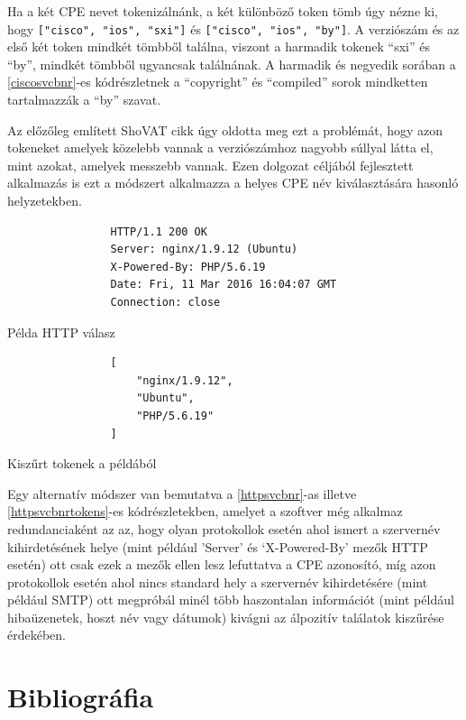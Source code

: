 \documentclass[a4paper,12pt]{article}
\begin{document}
	Ha a két CPE nevet tokenizálnánk, a két különböző token tömb úgy nézne ki, hogy \texttt{["cisco", "ios", "sxi"]} és \texttt{["cisco", "ios", "by"]}. A verziószám és az első két token mindkét tömbből találna, viszont a harmadik tokenek ``sxi'' és ``by'', mindkét tömbből ugyancsak találnának. A harmadik és negyedik sorában a \ref{ciscosvcbnr}-es kódrészletnek a ``copyright'' és ``compiled'' sorok mindketten tartalmazzák a ``by'' szavat.

	Az előzőleg említett ShoVAT\cite{shovat15} cikk úgy oldotta meg ezt a problémát, hogy azon tokeneket amelyek közelebb vannak a verziószámhoz nagyobb súllyal látta el, mint azokat, amelyek messzebb vannak. Ezen dolgozat céljából fejlesztett alkalmazás is ezt a módszert alkalmazza a helyes CPE név kiválasztására hasonló helyzetekben.
	
	\begin{multicols}{2}
		\begin{listing}[H]
			\begin{verbatim}
				HTTP/1.1 200 OK
				Server: nginx/1.9.12 (Ubuntu)
				X-Powered-By: PHP/5.6.19
				Date: Fri, 11 Mar 2016 16:04:07 GMT
				Connection: close
			\end{verbatim}
			\caption{Példa HTTP válasz}
			\label{httpsvcbnr}
		\end{listing}
		\begin{listing}[H]
			\begin{verbatim}
				[
					"nginx/1.9.12",
					"Ubuntu",
					"PHP/5.6.19"
				]
			\end{verbatim}
			\caption{Kiszűrt tokenek a példából}
			\label{httpsvcbnrtokens}
		\end{listing}
	\end{multicols}
	
	Egy alternatív módszer van bemutatva a \ref{httpsvcbnr}-as illetve \ref{httpsvcbnrtokens}-es kódrészletekben, amelyet a szoftver még alkalmaz redundanciaként az az, hogy olyan protokollok esetén ahol ismert a szervernév kihirdetésének helye (mint például 'Server' és `X-Powered-By' mezők HTTP esetén) ott csak ezek a mezők ellen lesz lefuttatva a CPE azonosító, míg azon protokollok esetén ahol nincs standard hely a szervernév kihirdetésére (mint például SMTP) ott megpróbál minél több haszontalan információt (mint például hibaüzenetek, hoszt név vagy dátumok) kivágni az álpozitív találatok kiszűrése érdekében.

\newpage
\section{Bibliográfia}

	\begingroup
	\renewcommand{\section}[2]{}
	\renewcommand{\markboth}[2]{}
		\begin{multicols}{2}
			
			
		\end{multicols}
	\endgroup
\end{document}

